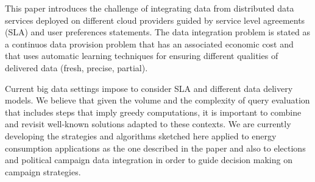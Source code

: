 

This paper introduces the challenge of integrating data from distributed data services deployed on different cloud providers guided by service level agreements (SLA) and user preferences statements. The data integration problem is stated as a continuos data provision problem that has an associated economic cost and that uses automatic learning techniques for ensuring different qualities of delivered data (fresh, precise, partial).

Current big data settings impose to consider SLA and different data delivery models. We believe that given the volume and the complexity of query evaluation that includes steps that imply greedy computations, it is important to combine and revisit well-known solutions adapted to these contexts. We are currently developing the strategies and algorithms sketched here applied to energy consumption applications as the one described in the paper and also to elections and political campaign data integration in order to guide decision making on campaign strategies.